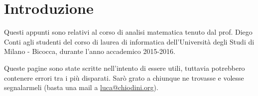 
\chapter*{Introduzione}

Questi appunti sono relativi al corso di analisi matematica tenuto dal prof. Diego Conti agli studenti del corso di laurea di informatica dell'Università degli Studi di Milano - Bicocca, durante l'anno accademico 2015-2016. 

Queste pagine sono state scritte nell'intento di essere utili, tuttavia potrebbero contenere errori tra i più disparati. Sarò grato a chiunque ne trovasse e volesse segnalarmeli (basta una mail a \href{mailto:luca@chiodini.org}{luca@chiodini.org}).